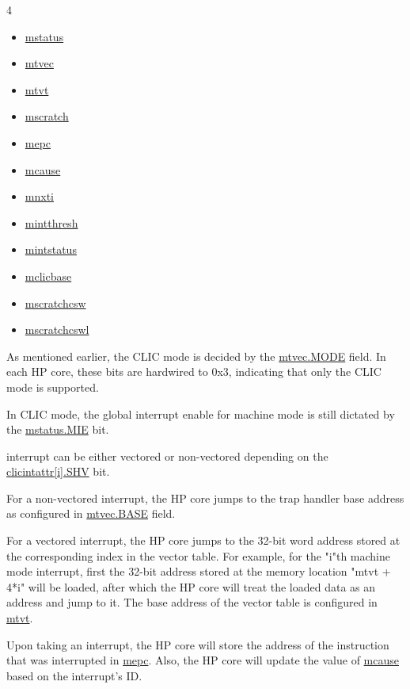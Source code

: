 \documentclass[main\_\_EN.tex]{subfiles}
\begin{document}
\begin{multicols}{4}
\begin{itemize}
\item \hyperref[regdesc:MSTATUS]{mstatus}
\item \hyperref[regdesc:MTVEC]{mtvec}
\item \hyperref[regdesc:MTVT]{mtvt}
\item \hyperref[regdesc:MSCRATCH]{mscratch}
\item \hyperref[regdesc:MEPC]{mepc}
\item \hyperref[regdesc:MCAUSE]{mcause}
\item \hyperref[regdesc:MNXTI_REG]{mnxti}
\item \hyperref[regdesc:MINTTHRESH]{mintthresh}
\item \hyperref[regdesc:MINTSTATUS]{mintstatus}
\item \hyperref[regdesc:MCLICBASE_REG]{mclicbase}
\item \hyperref[regdesc:MSCRATCHCSW_REG]{mscratchcsw}
\item \hyperref[regdesc:MSCRATCHCSWL_REG]{mscratchcswl}
\end{itemize}
\end{multicols}


As mentioned earlier, the CLIC mode is decided by the \hyperref[fielddesc:MTVECMODE]{mtvec.MODE} field. In each HP core, these bits are hardwired to 0x3, indicating that only the CLIC mode is supported.

In CLIC mode, the global interrupt enable for machine mode is still dictated by the \hyperref[fielddesc:MSTATUSMIE]{mstatus.MIE} bit.

interrupt can be either vectored or non-vectored depending on the \hyperref[fielddesc:MCLICINTATTR_i_SHV]{clicintattr[i].SHV} bit.

For a non-vectored interrupt, the HP core jumps to the trap handler base address as configured in \hyperref[fielddesc:MTVECBASE]{mtvec.BASE} field.

For a vectored interrupt, the HP core jumps to the 32-bit word address stored at the corresponding index in the vector table. For example, for the "i"th machine mode interrupt, first the 32-bit address stored at the memory location "mtvt + 4*i" will be loaded, after which the HP core will treat the loaded data as an address and jump to it. The base address of the vector table is configured in \hyperref[regdesc:MTVT]{mtvt}.

Upon taking an interrupt, the HP core will store the address of the instruction that was interrupted in \hyperref[regdesc:MEPC]{mepc}. Also, the HP core will update the value of \hyperref[regdesc:MCAUSE]{mcause} based on the interrupt's ID.
\end{document}
